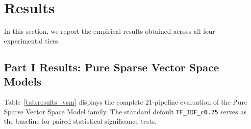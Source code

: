 \documentclass[10pt, a4paper]{article}
\begin{document}
\section{Results}
\label{sec:results}

In this section, we report the empirical results obtained across all four experimental tiers.

\subsection{Part I Results: Pure Sparse Vector Space Models}
\label{sec:results_part1}

Table~\ref{tab:results_vsm} displays the complete 21-pipeline evaluation of the Pure Sparse Vector Space Model family. The standard default \texttt{TF\_IDF\_c0.75} serves as the baseline for paired statistical significance tests.
\end{document}
